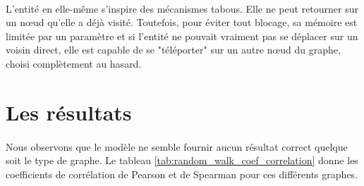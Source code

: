 \documentclass[a4paper, 10pt]{report}
\begin{document}
\paragraph{}L'entité en elle-même s'inspire des mécanismes tabous. Elle ne peut retourner sur un n\oe ud qu'elle a déjà visité. Toutefois, pour éviter tout blocage, sa mémoire est limitée par un paramètre et si l'entité ne pouvait vraiment pas se déplacer sur un voisin direct, elle est capable de se "téléporter" sur un autre n\oe ud du graphe, choisi complètement au hasard.

\newpage

	\section{Les résultats}

\paragraph{}Nous observons que le modèle ne semble fournir aucun résultat correct quelque soit le type de graphe. Le tableau \ref{tab:random_walk_coef_correlation} donne les coefficients de corrélation de Pearson et de Spearman pour ces différents graphes.
\end{document}
